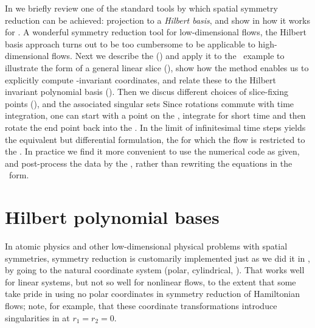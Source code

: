 \documentclass[preprint,number,sort&compress]{elsarticle}
\begin{document}
In  we briefly review one of the standard
tools by which spatial symmetry reduction can be achieved:
projection to a \emph{Hilbert basis}, and show in
 how it works for \cLf. A wonderful
symmetry reduction tool for low-dimensional flows, the
Hilbert basis approach turns out to be too cumbersome to be
applicable to high-dimensional flows. Next we describe the
\emph{\mframes} () and apply it to the \cLf\
example to illustrate the form of a general linear slice
(), show how the method enables us
to explicitly compute \Group-in\-vari\-ant coordinates, and
relate these to the Hilbert in\-vari\-ant polynomial basis
(). Then we discus different choices
of slice-fixing points (), and the
associated singular sets%
Since rotations commute with time integration, one can
start with a point on the \slice,
integrate for short time and then rotate the
end point back into the \slice.
In  the limit of
infinitesimal time steps yields the equivalent but differential
formulation, the \emph{\mslices} for which the flow is restricted to
the \reducedsp.
In practice we find it more convenient to use the
numerical code as given, and post-process the data by the \mframes,
rather than rewriting the equations in the \mslices\ form.


\section{\label{s:Hilbert} Hilbert polynomial bases}

In atomic physics and other low-dimensional physical problems
with spatial symmetries, symmetry reduction is customarily
implemented just as we did it in , by
going to the natural coordinate system (polar, cylindrical,
\etc). That works well for linear systems, but not so well
for nonlinear flows, to the extent that some take pride in
using no polar coordinates in symmetry reduction of
Hamiltonian flows; note, for
example, that these coordinate transformations introduce
singularities in  at $r_1=r_2=0$.
\end{document}
